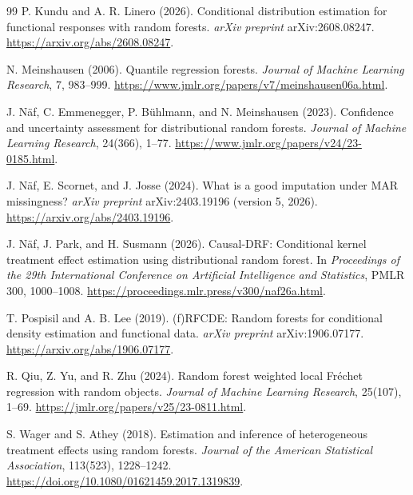 \documentclass[12pt,a4paper]{article}
\newcommand{\1}{\mathbf 1}
\begin{document}
\begin{thebibliography}{99}
P. Kundu and A. R. Linero (2026).
Conditional distribution estimation for functional responses with random forests.
\emph{arXiv preprint} arXiv:2608.08247.
\url{https://arxiv.org/abs/2608.08247}.

N. Meinshausen (2006).
Quantile regression forests.
\emph{Journal of Machine Learning Research}, 7, 983--999.
\url{https://www.jmlr.org/papers/v7/meinshausen06a.html}.

J. N\"af, C. Emmenegger, P. B\"uhlmann, and N. Meinshausen (2023).
Confidence and uncertainty assessment for distributional random forests.
\emph{Journal of Machine Learning Research}, 24(366), 1--77.
\url{https://www.jmlr.org/papers/v24/23-0185.html}.

J. N\"af, E. Scornet, and J. Josse (2024).
What is a good imputation under MAR missingness?
\emph{arXiv preprint} arXiv:2403.19196 (version 5, 2026).
\url{https://arxiv.org/abs/2403.19196}.

J. N\"af, J. Park, and H. Susmann (2026).
Causal-DRF: Conditional kernel treatment effect estimation using distributional random forest.
In \emph{Proceedings of the 29th International Conference on Artificial Intelligence and Statistics}, PMLR 300, 1000--1008.
\url{https://proceedings.mlr.press/v300/naf26a.html}.

T. Pospisil and A. B. Lee (2019).
(f)RFCDE: Random forests for conditional density estimation and functional data.
\emph{arXiv preprint} arXiv:1906.07177.
\url{https://arxiv.org/abs/1906.07177}.

R. Qiu, Z. Yu, and R. Zhu (2024).
Random forest weighted local Fr\'echet regression with random objects.
\emph{Journal of Machine Learning Research}, 25(107), 1--69.
\url{https://jmlr.org/papers/v25/23-0811.html}.

S. Wager and S. Athey (2018).
Estimation and inference of heterogeneous treatment effects using random forests.
\emph{Journal of the American Statistical Association}, 113(523), 1228--1242.
\url{https://doi.org/10.1080/01621459.2017.1319839}.
\end{thebibliography}
\end{document}
